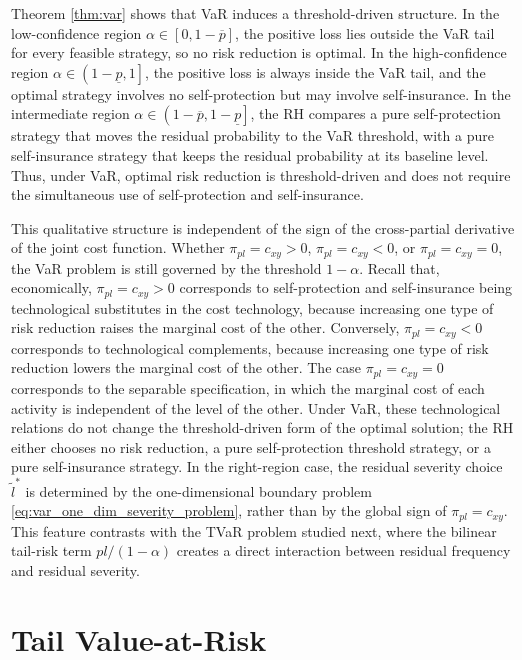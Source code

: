 \documentclass[a4paper,12pt]{article}
\begin{document}
Theorem \ref{thm:var} shows that VaR induces a threshold-driven structure. In the low-confidence region $\alpha\in\left[0,1-\overline{p}\right]$, the positive loss lies outside the VaR tail for every feasible strategy, so no risk reduction is optimal. In the high-confidence region $\alpha\in\left(1-\underline{p},1\right]$, the positive loss is always inside the VaR tail, and the optimal strategy involves no self-protection but may involve self-insurance. In the intermediate region $\alpha\in\left(1-\overline{p},1-\underline{p}\right]$, the RH compares a pure self-protection strategy that moves the residual probability to the VaR threshold, with a pure self-insurance strategy that keeps the residual probability at its baseline level. Thus, under VaR, optimal risk reduction is threshold-driven and does not require the simultaneous use of self-protection and self-insurance.

This qualitative structure is independent of the sign of the cross-partial derivative of the joint cost function. Whether $\pi_{pl}=c_{xy}>0$, $\pi_{pl}=c_{xy}<0$, or $\pi_{pl}=c_{xy}=0$, the VaR problem is still governed by the threshold $1-\alpha$. Recall that, economically, $\pi_{pl}=c_{xy}>0$ corresponds to self-protection and self-insurance being technological substitutes in the cost technology, because increasing one type of risk reduction raises the marginal cost of the other. Conversely, $\pi_{pl}=c_{xy}<0$ corresponds to technological complements, because increasing one type of risk reduction lowers the marginal cost of the other. The case $\pi_{pl}=c_{xy}=0$ corresponds to the separable specification, in which the marginal cost of each activity is independent of the level of the other. Under VaR, these technological relations do not change the threshold-driven form of the optimal solution; the RH either chooses no risk reduction, a pure self-protection threshold strategy, or a pure self-insurance strategy. In the right-region case, the residual severity choice $\tilde{l}^*$ is determined by the one-dimensional boundary problem \eqref{eq:var_one_dim_severity_problem}, rather than by the global sign of $\pi_{pl}=c_{xy}$. This feature contrasts with the TVaR problem studied next, where the bilinear tail-risk term $pl/\left(1-\alpha\right)$ creates a direct interaction between residual frequency and residual severity.

\section{Tail Value-at-Risk}\label{sec:tvar}
\end{document}
